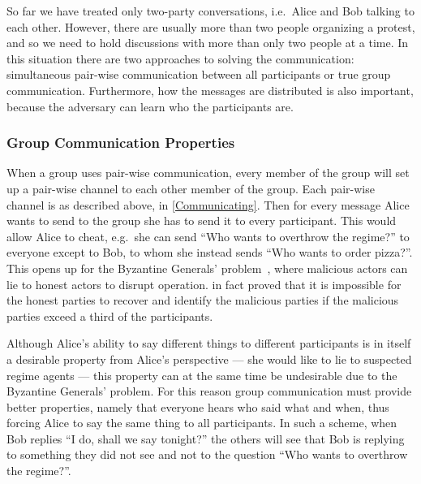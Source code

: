 So far we have treated only two-party conversations, i.e.\ Alice and Bob 
talking to each other.
However, there are usually more than two people organizing a protest, and so we 
need to hold discussions with more than only two people at a time.
In this situation there are two approaches to solving the communication:
simultaneous pair-wise communication between all participants or true group 
communication.
Furthermore, how the messages are distributed is also important, because the 
adversary can learn who the participants are.

\subsubsection{Group Communication Properties}
\label{GroupProperties}

When a group uses pair-wise communication, every member of the group will set 
up a pair-wise channel to each other member of the group.
Each pair-wise channel is as described above, in \cref{Communicating}.
Then for every message Alice wants to send to the group she has to send it to 
every participant.
This would allow Alice to cheat, e.g.\ she can send \enquote{Who wants to 
  overthrow the regime?} to everyone except to Bob, to whom she instead sends 
\enquote{Who wants to order pizza?}.
This opens up for the Byzantine Generals' problem~\cite{ByzantineGenerals}, 
where malicious actors can lie to honest actors to disrupt operation.
\citet{ByzantineGenerals} in fact proved that it is impossible for the honest 
parties to recover and identify the malicious parties if the malicious parties 
exceed a third of the participants.
  
Although Alice's ability to say different things to different participants is 
in itself a desirable property from Alice's perspective --- she would like to 
lie to suspected regime agents --- this property can at the same time be 
undesirable due to the Byzantine Generals' problem.
For this reason group communication must provide better properties, namely that 
everyone hears who said what and when, thus forcing Alice to say the same thing 
to all participants.
In such a scheme, when Bob replies \enquote{I do, shall we say tonight?} the 
others will see that Bob is replying to something they did not see and not to 
the question \enquote{Who wants to overthrow the regime?}.

